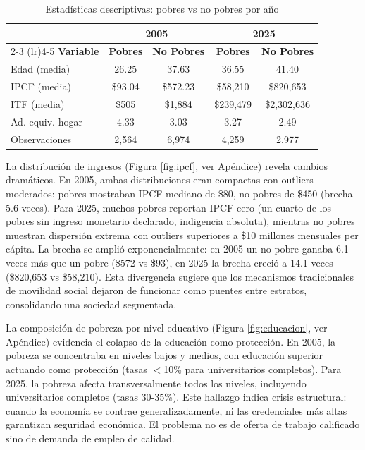 \documentclass[11pt,a4paper]{article}
\begin{document}
\begin{table}[H]
\centering
\small
\begin{tabular}{lcccc}
\toprule
 & \multicolumn{2}{c}{\textbf{2005}} & \multicolumn{2}{c}{\textbf{2025}} \\
\cmidrule(lr){2-3} \cmidrule(lr){4-5}
\textbf{Variable} & \textbf{Pobres} & \textbf{No Pobres} & \textbf{Pobres} & \textbf{No Pobres} \\
\midrule
Edad (media) & 26.25 & 37.63 & 36.55 & 41.40 \\
IPCF (media) & \$93.04 & \$572.23 & \$58,210 & \$820,653 \\
ITF (media) & \$505 & \$1,884 & \$239,479 & \$2,302,636 \\
Ad. equiv. hogar & 4.33 & 3.03 & 3.27 & 2.49 \\
Observaciones & 2,564 & 6,974 & 4,259 & 2,977 \\
\bottomrule
\end{tabular}
\caption{Estadísticas descriptivas: pobres vs no pobres por año}
\label{tab:descriptivos}
\end{table}

La distribución de ingresos (Figura \ref{fig:ipcf}, ver Apéndice) revela cambios dramáticos. En 2005, ambas distribuciones eran compactas con outliers moderados: pobres mostraban IPCF mediano de \$80, no pobres de \$450 (brecha 5.6 veces). Para 2025, muchos pobres reportan IPCF cero (un cuarto de los pobres sin ingreso monetario declarado, indigencia absoluta), mientras no pobres muestran dispersión extrema con outliers superiores a \$10 millones mensuales per cápita. La brecha se amplió exponencialmente: en 2005 un no pobre ganaba 6.1 veces más que un pobre (\$572 vs \$93), en 2025 la brecha creció a 14.1 veces (\$820,653 vs \$58,210). Esta divergencia sugiere que los mecanismos tradicionales de movilidad social dejaron de funcionar como puentes entre estratos, consolidando una sociedad segmentada.

La composición de pobreza por nivel educativo (Figura \ref{fig:educacion}, ver Apéndice) evidencia el colapso de la educación como protección. En 2005, la pobreza se concentraba en niveles bajos y medios, con educación superior actuando como protección (tasas $<$10\% para universitarios completos). Para 2025, la pobreza afecta transversalmente todos los niveles, incluyendo universitarios completos (tasas 30-35\%). Este hallazgo indica crisis estructural: cuando la economía se contrae generalizadamente, ni las credenciales más altas garantizan seguridad económica. El problema no es de oferta de trabajo calificado sino de demanda de empleo de calidad.
\end{document}
